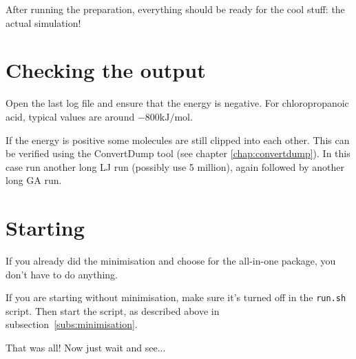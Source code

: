 
After running the preparation, everything should be ready for the cool stuff: 
the actual simulation!

\section{Checking the output}
Open the last log file and ensure that the energy is negative. For 
chloropropanoic acid, typical values are around $-800 \textrm {kJ/mol}$.

If the energy is positive some molecules are still clipped into each other. 
This can be verified using the ConvertDump tool (see chapter 
\ref{chap:convertdump}).
In this case run another long LJ run (possibly use 5 million), again followed 
by another long GA run.

\section{Starting}
If you already did the minimisation and choose for the all-in-one package, you 
don't have to do anything.

If you are starting without minimisation, make sure it's turned off in the 
\verb|run.sh| script. Then start the script, as described above in 
subsection~\ref{subs:minimisation}.

That was all! Now just wait and see...